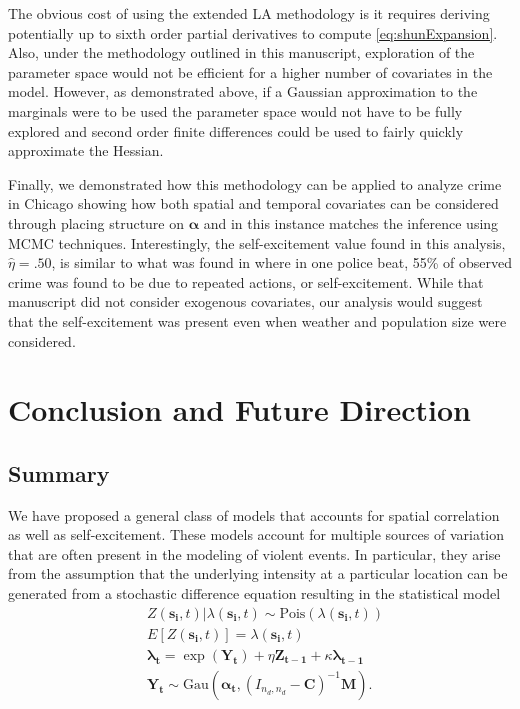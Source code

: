 \documentclass[11pt]{isuthesis}
\begin{document}
	The obvious cost of using the extended LA methodology is it requires deriving potentially up to sixth order partial derivatives to compute \eqref{eq:shunExpansion}.  Also, under the methodology outlined in this manuscript, exploration of the parameter space would not be efficient for a higher number of covariates in the model.  However, as demonstrated above, if a Gaussian approximation to the marginals were to be used the parameter space would not have to be fully explored and second order finite differences could be used to fairly quickly approximate the Hessian.
	
	Finally, we demonstrated how this methodology can be applied to analyze crime in Chicago showing how both spatial and temporal covariates can be considered through placing structure on $\boldsymbol{\alpha}$ and in this instance matches the inference using MCMC techniques.  Interestingly, the self-excitement value found in this analysis, $\hat{\eta}=.50$, is similar to what was found in \cite{mohler2013modeling} where in one police beat, 55\% of observed crime was found to be due to repeated actions, or self-excitement.  While that manuscript did not consider exogenous covariates, our analysis would suggest that the self-excitement was present even when weather and population size were considered.  
	\chapter{Conclusion and Future Direction}
	
	\section{Summary}
	
	We have proposed a general class of models that accounts for spatial correlation as well as self-excitement.  These models account for multiple sources of variation that are often present in the modeling of violent events.  In particular, they arise from the assumption that the underlying intensity at a particular location can be generated from a stochastic difference equation resulting in the statistical model
	\begin{align}
	& Z(\boldsymbol{s_i},t)|\lambda(\boldsymbol{s_i},t) \sim \mbox{Pois}(\lambda(\boldsymbol{s_i},t)) \label{eq:StochDDS} \\
	& E[Z(\boldsymbol{s_i},t)]=\lambda(\boldsymbol{s_i},t)\nonumber\\
	& \boldsymbol{\lambda_t} = \exp(\boldsymbol{Y_t})+\eta \boldsymbol{Z_{t-1}}+\kappa \boldsymbol{\lambda_{t-1}}\nonumber\\
	& \boldsymbol{Y_t} \sim \mbox{Gau}\textit{} (\boldsymbol{\alpha_t},(I_{{n_d},{n_d}}-\boldsymbol{C})^{-1}\boldsymbol{M})\nonumber.
	\end{align}
\end{document}
